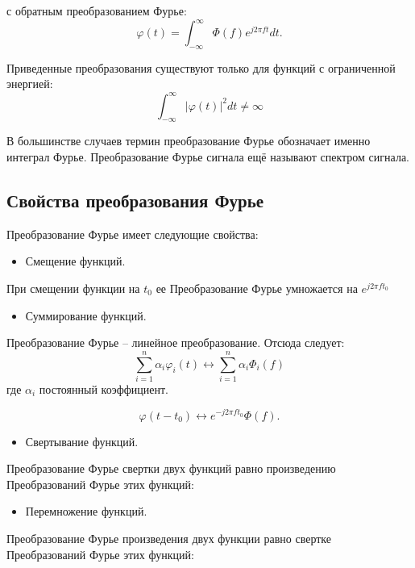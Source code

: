 \documentclass[a4paper,14pt]{extarticle}
\begin{document}
с обратным преобразованием Фурье:
\begin{equation}
\varphi(t) = \int_{-\infty}^{\infty} \Phi(f) e^{j2 \pi ft} dt.
\end{equation}

Приведенные преобразования существуют только для функций с ограниченной энергией:
\begin{equation}
\int_{-\infty}^{\infty} \rvert \varphi(t) \rvert^{2} dt \neq \infty
\end{equation}

В большинстве случаев термин преобразование Фурье обозначает именно интеграл Фурье. Преобразование Фурье сигнала ещё называют спектром сигнала.

\subsection{Свойства преобразования Фурье}

Преобразование Фурье имеет следующие свойства:

\begin{itemize}
	\item Смещение функций.
\end{itemize}
При смещении функции на $t_{0}$ ее Преобразование Фурье умножается на $e^{j2 \pi f t_{0}}$

\begin{itemize}
	\item Суммирование функций.
\end{itemize}
Преобразование Фурье – линейное преобразование. Отсюда следует:
\begin{equation}
\sum\limits_{i=1}^{n} \alpha_{i} \varphi_{i} (t) \leftrightarrow \sum\limits_{i=1}^{n} \alpha_{i} \Phi_{i} (f)
\end{equation}
где $\alpha_{i}$ постоянный коэффициент.

\begin{equation}
\varphi(t-t_{0}) \leftrightarrow e^{-j2 \pi f t_{0}}\Phi(f).
\end{equation}

\begin{itemize}
	\item Свертывание функций.
\end{itemize}
Преобразование Фурье свертки двух функций равно произведению Преобразований Фурье этих функций:

\begin{itemize}
	\item Перемножение функций.
\end{itemize}
Преобразование Фурье произведения двух функции равно свертке Преобразований Фурье этих функций:
\end{document}
